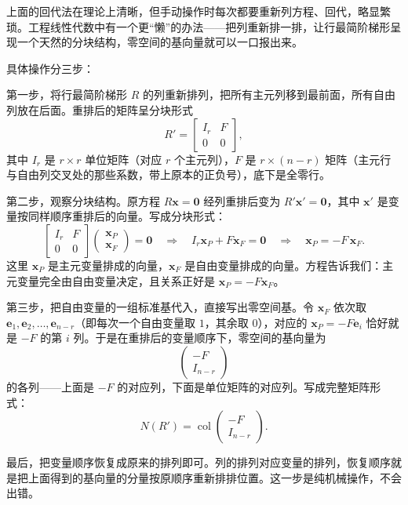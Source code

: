 \documentclass[UTF8]{ctexbook}
\begin{document}
上面的回代法在理论上清晰，但手动操作时每次都要重新列方程、回代，略显繁琐。工程线性代数中有一个更“懒”的办法——把列重新排一排，让行最简阶梯形呈现一个天然的分块结构，零空间的基向量就可以一口报出来。

具体操作分三步：

第一步，将行最简阶梯形 $R$ 的列重新排列，把所有主元列移到最前面，所有自由列放在后面。重排后的矩阵呈分块形式
\[
R'=\left[\begin{array}{c|c}
I_r & F\\
\hline
0 & 0
\end{array}\right],
\]
其中 $I_r$ 是 $r\times r$ 单位矩阵（对应 $r$ 个主元列），$F$ 是 $r\times (n-r)$ 矩阵（主元行与自由列交叉处的那些系数，带上原本的正负号），底下是全零行。

第二步，观察分块结构。原方程 $R\mathbf{x}=\mathbf{0}$ 经列重排后变为 $R'\mathbf{x}'=\mathbf{0}$，其中 $\mathbf{x}'$ 是变量按同样顺序重排后的向量。写成分块形式：
\[
\left[\begin{array}{c|c}
I_r & F\\
\hline
0 & 0
\end{array}\right]
\begin{pmatrix}\mathbf{x}_P\\\hline\mathbf{x}_F\end{pmatrix}
=\mathbf{0}
\quad\Longrightarrow\quad
I_r\mathbf{x}_P+F\mathbf{x}_F=\mathbf{0}
\quad\Longrightarrow\quad
\mathbf{x}_P=-F\,\mathbf{x}_F.
\]
这里 $\mathbf{x}_P$ 是主元变量排成的向量，$\mathbf{x}_F$ 是自由变量排成的向量。方程告诉我们：主元变量完全由自由变量决定，且关系正好是 $\mathbf{x}_P=-F\mathbf{x}_F$。

第三步，把自由变量的一组标准基代入，直接写出零空间基。令 $\mathbf{x}_F$ 依次取 $\mathbf{e}_1,\mathbf{e}_2,\dots,\mathbf{e}_{n-r}$（即每次一个自由变量取 $1$，其余取 $0$），对应的 $\mathbf{x}_P=-F\mathbf{e}_i$ 恰好就是 $-F$ 的第 $i$ 列。于是在重排后的变量顺序下，零空间的基向量为
\[
\begin{pmatrix}-F\\\hline I_{n-r}\end{pmatrix}
\]
的各列——上面是 $-F$ 的对应列，下面是单位矩阵的对应列。写成完整矩阵形式：
\[
N(R')=\operatorname{col}\begin{pmatrix}-F\\ I_{n-r}\end{pmatrix}.
\]

最后，把变量顺序恢复成原来的排列即可。列的排列对应变量的排列，恢复顺序就是把上面得到的基向量的分量按原顺序重新排排位置。这一步是纯机械操作，不会出错。
\end{document}

